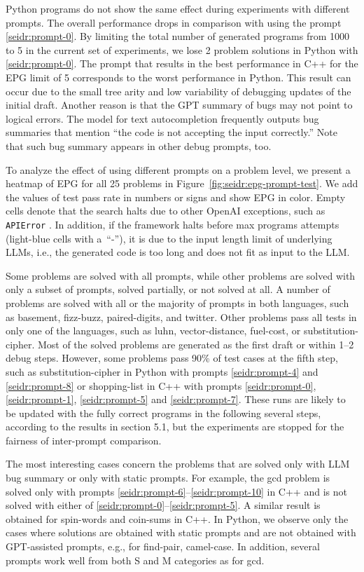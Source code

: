 Python programs do not show the same effect during experiments with different prompts. 
The overall performance drops in comparison with using the prompt \ref{seidr:prompt-0}. 
By limiting the total number of generated programs from 1000 
to 5 in the current set of experiments, we lose 2 problem solutions in Python with \ref{seidr:prompt-0}. 
The prompt that results in the best performance in C++ for the EPG limit of 5 corresponds to the worst performance in Python. 
This result can occur due to the small tree arity and low variability of debugging updates of the initial draft. 
Another reason is that the GPT summary of bugs may not point to logical errors. The model for text autocompletion frequently outputs bug summaries that mention ``the code is not accepting the input correctly.''
Note that such bug summary appears in other debug prompts, too. 

To analyze the effect of using different prompts on a problem level, we present a heatmap of EPG for all 25 problems in Figure~\ref{fig:seidr:epg-prompt-test}. 
We add the values of test pass rate in numbers or signs and show EPG in color. 
Empty cells denote that the search halts due to other OpenAI exceptions, such as \texttt{APIError} \cite{OpenAIPlatform}.
In addition, if the framework halts before max programs attempts (light-blue cells with a~``-''), it is due to the input length limit of underlying LLMs, i.e., the generated code is too long and does not fit as input to the LLM.

Some problems are solved with all prompts, while other problems are solved with only a subset of prompts, solved partially, or not solved at all. 
A number of problems are solved with all or the majority of prompts in both languages, such as basement, fizz-buzz, paired-digits, and twitter.
Other problems pass all tests in only one of the languages, such as luhn, vector-distance, fuel-cost, or substitution-cipher. 
Most of the solved problems are generated as the first draft or within 1--2 debug steps. 
However, some problems pass 90\% of test cases at the fifth step, such as substitution-cipher in Python with prompts \ref{seidr:prompt-4} and \ref{seidr:prompt-8} or shopping-list in C++ with prompts \ref{seidr:prompt-0}, \ref{seidr:prompt-1}, \ref{seidr:prompt-5} and \ref{seidr:prompt-7}. 
These runs are likely to be updated with the fully correct programs in the following several steps, according to the results in section 5.1, but the experiments
are stopped for the fairness of inter-prompt comparison.

The most interesting cases concern the problems that are solved only with LLM bug summary or only with static prompts. 
For example, the gcd problem is solved only with prompts \ref{seidr:prompt-6}--\ref{seidr:prompt-10} in C++ and is not solved with either of \ref{seidr:prompt-0}--\ref{seidr:prompt-5}. 
A similar result is obtained for spin-words and coin-sums in C++.
In Python, we observe only the cases where solutions are obtained with static prompts and are not obtained with GPT-assisted prompts, e.g., for find-pair, camel-case. In addition, several prompts work well from both S and M categories as for gcd. 


